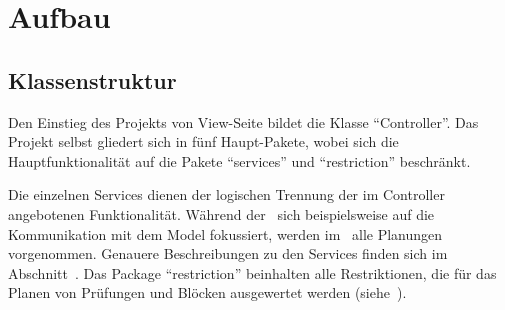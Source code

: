 \section{Aufbau}\label{sec:aufbau}

\subsection{Klassenstruktur}\label{subsec:klassenstruktur}
\begin{center}
\end{center}

\clearpage
Den Einstieg des Projekts von View-Seite bildet die Klasse \enquote{Controller}.
Das Projekt selbst gliedert sich in fünf Haupt-Pakete, wobei sich die Hauptfunktionalität
auf die Pakete \enquote{services} und \enquote{restriction} beschränkt.

Die einzelnen Services dienen der logischen Trennung der im Controller angebotenen Funktionalität.
Während der~ sich beispielsweise auf die Kommunikation mit dem Model fokussiert,
werden im~ alle Planungen vorgenommen.
Genauere Beschreibungen zu den Services finden sich im Abschnitt~.
Das Package \enquote{restriction} beinhalten alle Restriktionen, die für das Planen von Prüfungen
und Blöcken ausgewertet werden (siehe~).

